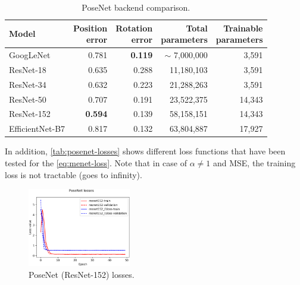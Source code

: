 \begin{table}[htbp]
    \caption{PoseNet backend comparison.}
    \begin{center}
        \begin{tabular}{lrrrr}
            \toprule
            {Model}         & \thead{Position                                              \\error} & \thead{Rotation\\error} & \thead{Total\\parameters} & \thead{Trainable\\parameters} \\
            \midrule
            GoogLeNet       & 0.781           & \textbf{0.119} & $\sim$ 7,000,000 & 3,591  \\
            ResNet-18       & 0.635           & 0.288          & 11,180,103       & 3,591  \\
            ResNet-34       & 0.632           & 0.223          & 21,288,263       & 3,591  \\
            ResNet-50       & 0.707           & 0.191          & 23,522,375       & 14,343 \\
            ResNet-152      & \textbf{0.594}  & 0.139          & 58,158,151       & 14,343 \\
            EfficientNet-B7 & 0.817           & 0.132          & 63,804,887       & 17,927 \\
            \bottomrule
        \end{tabular}
        \label{tab:posenet-backends}
    \end{center}
\end{table}

In addition, \cref{tab:posenet-losses} shows different loss functions that have been tested for the \cref{eq:menet-loss}. Note that in case of $\alpha \neq 1$ and MSE, the training loss is not tractable (goes to infinity).
\begin{figure}[htbp]
    \begin{center}
        \includegraphics[width=0.4\textwidth]{./imgs/posenet_losses.png}
    \end{center}
    \caption{PoseNet (ResNet-152) losses.}
    \label{fig:posenet-losses}
\end{figure}

